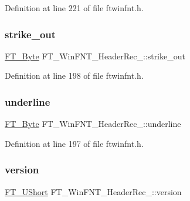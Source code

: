Definition at line 221 of file ftwinfnt.\+h.

\mbox{\label{struct_f_t___win_f_n_t___header_rec___ac8525309fd08919fb381ca9f193ed59a}} 
\subsubsection{\texorpdfstring{strike\_out}{strike\_out}}
{\footnotesize\ttfamily \mbox{\hyperlink{fttypes_8h_a51f26183ca0c9f4af958939648caeccd}{F\+T\+\_\+\+Byte}} F\+T\+\_\+\+Win\+F\+N\+T\+\_\+\+Header\+Rec\+\_\+\+::strike\+\_\+out}



Definition at line 198 of file ftwinfnt.\+h.

\mbox{\label{struct_f_t___win_f_n_t___header_rec___ab24fdf9e3524a3a43fd65a58ca639474}} 
\subsubsection{\texorpdfstring{underline}{underline}}
{\footnotesize\ttfamily \mbox{\hyperlink{fttypes_8h_a51f26183ca0c9f4af958939648caeccd}{F\+T\+\_\+\+Byte}} F\+T\+\_\+\+Win\+F\+N\+T\+\_\+\+Header\+Rec\+\_\+\+::underline}



Definition at line 197 of file ftwinfnt.\+h.

\mbox{\label{struct_f_t___win_f_n_t___header_rec___a88f8539fc11d2fac60f172553caa5b8d}} 
\subsubsection{\texorpdfstring{version}{version}}
{\footnotesize\ttfamily \mbox{\hyperlink{fttypes_8h_a937f6c17cf5ffd09086d8610c37b9f58}{F\+T\+\_\+\+U\+Short}} F\+T\+\_\+\+Win\+F\+N\+T\+\_\+\+Header\+Rec\+\_\+\+::version}



